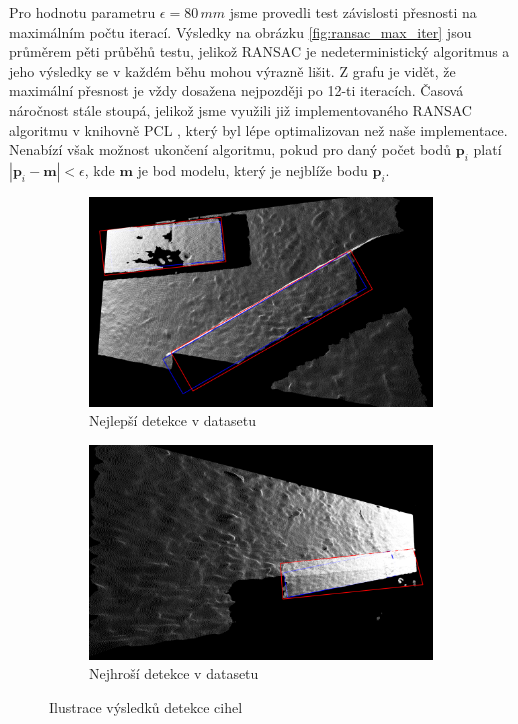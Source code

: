 \documentclass[twoside]{ctuthesis}
\newcommand{\tl}[1]{$\mathbf{#1}$}
\begin{document}
Pro hodnotu parametru $\epsilon = 80\,mm$ jsme provedli test závislosti přesnosti na maximálním počtu iterací. Výsledky na obrázku \ref{fig:ransac_max_iter} jsou průměrem pěti průběhů testu, jelikož RANSAC je nedeterministický algoritmus a jeho výsledky se v každém běhu mohou výrazně lišit. Z grafu je vidět, že maximální přesnost je vždy dosažena nejpozději po 12-ti iteracích. Časová náročnost stále stoupá, jelikož jsme využili již implementovaného RANSAC algoritmu v knihovně PCL \cite{pcl}, který byl lépe optimalizovan než naše implementace. Nenabízí však možnost ukončení algoritmu, pokud pro daný počet bodů $\mathbf{p}_i$ platí $|\mathbf{p}_i - \mathbf{m}| < \epsilon$, kde \tl{m} je bod modelu, který je nejblíže bodu $\mathbf{p}_i$.

\begin{figure}
    \centering
    \begin{subfigure}{0.5\textwidth}
      \centering
      \includegraphics[width=0.99\linewidth]{pictures/res_det_good.png}
      \caption{Nejlepší detekce v datasetu}
      \label{subfig:object_det_good}
    \end{subfigure}
    \begin{subfigure}{0.49\textwidth}
      \centering
      \includegraphics[width=0.99\linewidth]{pictures/res_det_bad.png}
      \caption{Nejhroší detekce v datasetu}
      \label{subfig:object_det_bad}
    \end{subfigure}
    \caption{Ilustrace výsledků detekce cihel}
    \label{fig:object_det_res}
\end{figure}
\end{document}
